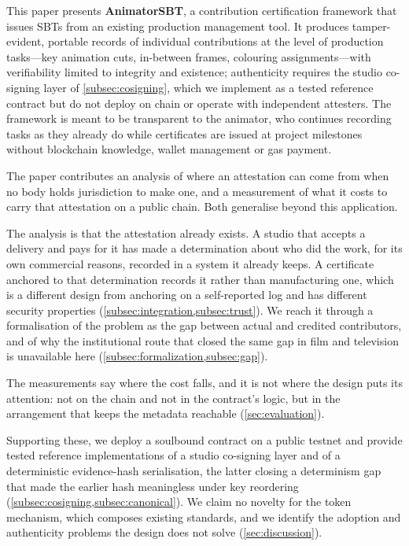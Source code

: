 This paper presents \textbf{AnimatorSBT}, a contribution certification framework that
issues SBTs from an existing production management tool. It produces tamper-evident,
portable records of individual contributions at the level of production tasks---key
animation cuts, in-between frames, colouring assignments---with verifiability limited to
integrity and existence; authenticity requires the studio co-signing layer of
\cref{subsec:cosigning}, which we implement as a tested reference contract but do not
deploy on chain or operate with independent attesters. The framework is meant to be
transparent to the animator, who continues recording tasks as they already do while
certificates are issued at project milestones without blockchain knowledge, wallet
management or gas payment.

The paper contributes an analysis of where an attestation can come from when no body
holds jurisdiction to make one, and a measurement of what it costs to carry that
attestation on a public chain. Both generalise beyond this application.

The analysis is that the attestation already exists. A studio that accepts a delivery and
pays for it has made a determination about who did the work, for its own commercial
reasons, recorded in a system it already keeps. A certificate anchored to that
determination records it rather than manufacturing one, which is a different design from
anchoring on a self-reported log and has different security properties
(\cref{subsec:integration,subsec:trust}). We reach it through a formalisation of the
problem as the gap between actual and credited contributors, and of why the institutional
route that closed the same gap in film and television is unavailable here
(\cref{subsec:formalization,subsec:gap}).

The measurements say where the cost falls, and it is not where the design puts its
attention: not on the chain and not in the contract's logic, but in the arrangement that
keeps the metadata reachable (\cref{sec:evaluation}).

Supporting these, we deploy a soulbound contract on a public testnet and provide tested
reference implementations of a studio co-signing layer and of a deterministic
evidence-hash serialisation, the latter closing a determinism gap that made the earlier
hash meaningless under key reordering (\cref{subsec:cosigning,subsec:canonical}). We claim
no novelty for the token mechanism, which composes existing standards, and we identify the
adoption and authenticity problems the design does not solve (\cref{sec:discussion}).

